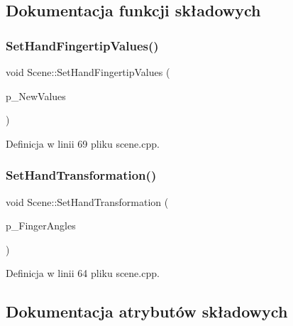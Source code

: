 \subsection{Dokumentacja funkcji składowych}
\mbox{\label{class_scene_a4dcd24690f433927c6ca75e9980afd53}} 
\subsubsection{\texorpdfstring{Set\+Hand\+Fingertip\+Values()}{SetHandFingertipValues()}}
{\footnotesize\ttfamily void Scene\+::\+Set\+Hand\+Fingertip\+Values (\begin{DoxyParamCaption}\item[{Q\+Vector$<$ int $>$}]{p\+\_\+\+New\+Values }\end{DoxyParamCaption})}



Definicja w linii 69 pliku scene.\+cpp.

\mbox{\label{class_scene_ae58cf344ad78420d37acde7984c9a4e8}} 
\subsubsection{\texorpdfstring{Set\+Hand\+Transformation()}{SetHandTransformation()}}
{\footnotesize\ttfamily void Scene\+::\+Set\+Hand\+Transformation (\begin{DoxyParamCaption}\item[{Q\+Vector$<$ Q\+Vector$<$ float $>$$>$}]{p\+\_\+\+Finger\+Angles }\end{DoxyParamCaption})}



Definicja w linii 64 pliku scene.\+cpp.



\subsection{Dokumentacja atrybutów składowych}
\mbox{\label{class_scene_a55d0f4c21e5ac40b4ad53a67bf851ff7}} 
